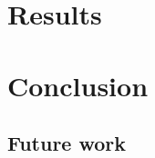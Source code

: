 \documentclass[UKenglish]{duo/ifimaster}  %
\begin{document}
\chapter{Results}                     %

\chapter{Conclusion}                     %
\section{Future work}

\backmatter{}
\printbibliography
\end{document}
